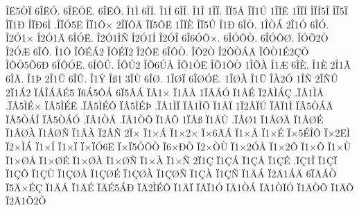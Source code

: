 {^^ce^^cb5^^d2^^cf
6^^ce^^cb^^d3.
6^^ce^^cb^^d3^^cb.
6^^ce^^cb^^d4.
^^ce1^^cc
6^^ce^^cd.
^^ce1^^cd
6^^ce^^ce.
^^ce1^^ce
1^^ce^^cf.
^^ce^^cf5^^c5
^^ce^^cf1^^da
1^^ce^^cf^^ca
1^^ce^^cf^^cd
^^ce^^cf^^cd5^^ce
^^ce^^cf5^^cf
^^ce^^cf1^^d0
^^ce^^cf^^d06^^cc
.^^ce^^cf^^d35^^cb
^^ce^^cf1^^d4^^d7
2^^ce^^cf^^d4^^c4
^^ce^^cf5^^d4^^cb
1^^ce^^cf^^c8
^^ce^^cf5^^db
^^ce1^^d0
6^^ce^^d2.
1^^ce^^d2^^c1
2^^ce1^^d3
6^^ce^^d3.
^^ce2^^d31^^d7
^^ce2^^d31^^c4
6^^ce^^d3^^cb.
^^ce2^^d31^^cc^^d1
^^ce2^^d31^^cd
^^ce2^^d3^^ce
6^^ce6^^d3^^d4^^d7.
6^^ce^^d3^^d4^^d2.
6^^ce^^d3^^d4^^d8.
^^ce^^d3^^d52^^d2
^^ce2^^d3^^c6
6^^ce^^d4.
^^ce1^^d4
^^ce^^d4^^c9^^c12
^^ce^^d4^^c9^^cf2
^^ce2^^d4^^cb
6^^ce^^d4^^d2.
^^ce^^d42^^d2
^^ce2^^d4^^d2^^c1^^c4
^^ce^^d4^^d21^^c92^^c7^^d2
^^ce^^d4^^d25^^d56^^d0
6^^ce^^d4^^d3^^cb.
6^^ce^^d4^^db.
^^ce^^d5^^da2
^^ce^^d56^^da^^c5
^^ce^^d51^^d3^^cb
^^ce^^d51^^d4^^d2
1^^ce^^d5^^c0
^^ce1^^c6
6^^ce^^c8.
^^ce1^^c8
2^^ce1^^c3
6^^ce^^c3.
^^ce1^^de
2^^ce1^^db
6^^ce^^db.
^^ce1^^dd
^^ce^^df1
3^^ce^^d9
6^^ce^^d8.
1^^ce^^d8^^cf
6^^ce^^d8^^d3^^cb.
1^^ce^^d8^^c0
^^ce1^^dc
^^ce^^c02^^d3
1^^ce^^d1
2^^ce^^d1^^db
2^^cf1^^c12
^^cf^^c1^^ce^^c1^^c2^^c95
^^cf6^^c15^^d4^^c1
6^^cf5^^c2^^c1
^^cf^^c21^^d7
^^cf1^^c2^^c5
1^^cf^^c2^^c5^^d3
^^cf1^^c2^^c9
^^cf2^^c2^^cc^^c1^^c7
.^^cf^^c21^^cc^^c5
.^^cf^^c25^^cc^^c9^^d7
^^cf^^c25^^cc^^c9^^cb
.^^cf^^c25^^cc^^c9^^d4
^^cf^^c25^^cc^^c9^^de
.^^cf^^c21^^cc^^cf
^^cf^^c21^^cc^^d5
^^cf1^^c2^^cf
1^^cf2^^c2^^cf^^da
^^cf^^c2^^cf1^^cc
^^cf^^c25^^d2^^c1^^c4
^^cf^^c25^^d2^^c1^^cd
^^cf^^c25^^d2^^c1^^d3
.^^cf^^c21^^d2^^c5
.^^cf^^c21^^d2^^d5
^^cf1^^c2^^d5
1^^cf^^c2^^df
^^cf1^^c2^^d9
.^^cf^^c2^^d81
^^cf1^^c2^^d8^^c5
^^cf1^^c2^^d8^^c9
^^cf1^^c2^^d8^^c0
^^cf1^^c2^^d8^^d1
^^cf1^^c2^^c0
^^cf2^^c2^^d1
2^^cf^^d7
^^cf1^^d7^^c1
^^cf1^^d72^^d7
^^cf^^d76^^c4^^c1
^^cf1^^d7^^c5
^^cf1^^d7^^c9
^^cf^^d75^^c9^^ce^^d4
^^cf^^d72^^cb^^cc
^^cf2^^d7^^cc^^c1
^^cf1^^d7^^cd
^^cf1^^d7^^cf
^^cf^^d7^^cf^^d36^^cb
^^cf^^d7^^cf5^^d3^^d4^^d2
^^cf6^^d7^^d0^^d2
^^cf2^^d7^^d2^^d9
^^cf1^^d72^^d3^^c5
^^cf1^^d72^^d4
^^cf1^^d7^^d5
^^cf1^^d7^^d9
^^cf1^^d7^^d8^^c5
^^cf1^^d7^^d8^^c9
^^cf1^^d7^^d8^^c0
^^cf1^^d7^^d8^^d1
^^cf1^^d7^^c0
^^cf1^^d7^^d1
2^^cf1^^c7
^^cf1^^c7^^c1
^^cf1^^c7^^c5
^^cf1^^c7^^c9
.^^cf^^c71^^ce
^^cf1^^c7^^cf
^^cf1^^c7^^d5
^^cf1^^c7^^d9
^^cf1^^c7^^d8^^c5
^^cf1^^c7^^d8^^c9
^^cf1^^c7^^d8^^c0
^^cf1^^c7^^d8^^d1
^^cf1^^c7^^c0
^^cf1^^c7^^d1
^^cf1^^c4^^c1
^^cf2^^c41^^c1^^c4
6^^cf^^c4^^c1^^d2
^^cf5^^c4^^d7^^c9^^c7
^^cf1^^c4^^c5
^^cf1^^c4^^c9
^^cf^^c4^^c95^^c1^^d0
^^cf^^c42^^cc^^c9^^d4
^^cf1^^c4^^cf
^^cf^^c4^^cf1^^d3
^^cf^^c41^^d2^^c1
^^cf^^c41^^d2^^cf^^d3
^^cf1^^c4^^d2^^d5
^^cf1^^c4^^d5
^^cf2^^c41^^d52^^d2
}
